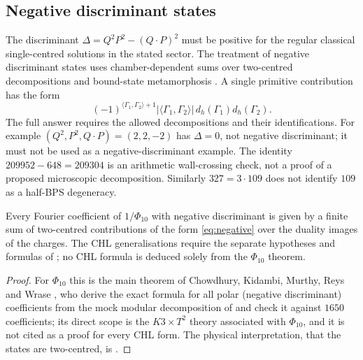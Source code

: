\subsection{Negative discriminant states}\label{ssec:negative}

The discriminant $\Delta=Q^2P^2-(Q\cdot P)^2$ must be positive for the regular classical single-centred solutions in the stated sector. The treatment of negative discriminant states uses chamber-dependent sums over two-centred decompositions and bound-state metamorphosis \cite{Sen11negative,CKMRW20}. A single primitive contribution has the form
\begin{equation}\label{eq:negative}
(-1)^{\langle\Gamma_1,\Gamma_2\rangle+1}|\langle\Gamma_1,\Gamma_2\rangle|\,d_h(\Gamma_1)d_h(\Gamma_2).
\end{equation}
The full answer requires the allowed decompositions and their identifications. For example $(Q^2,P^2,Q\cdot P)=(2,2,-2)$ has $\Delta=0$, not negative discriminant; it must not be used as a negative-discriminant example. The identity $209952-648=209304$ is an arithmetic wall-crossing check, not a proof of a proposed microscopic decomposition. Similarly $327=3\cdot109$ does not identify $109$ as a half-BPS degeneracy.

\begin{theorem}[claim 8]\label{thm:negative}
Every Fourier coefficient of $1/\Phi_{10}$ with negative discriminant is given by a finite sum of two-centred contributions of the form \eqref{eq:negative} over the duality images of the charges. The CHL generalisations require the separate hypotheses and formulas of \cite{Sen11negative}; no CHL formula is deduced solely from the $\Phi_{10}$ theorem.
\end{theorem}

\begin{proof}
For $\Phi_{10}$ this is the main theorem of Chowdhury, Kidambi, Murthy, Reys and Wrase \cite{CKMRW20}, who derive the exact formula for all polar (negative discriminant) coefficients from the mock modular decomposition of \cite{DMZ12} and check it against $1650$ coefficients; its direct scope is the $K3\times T^2$ theory associated with $\Phi_{10}$, and it is not cited as a proof for every CHL form. The physical interpretation, that the states are two-centred, is \cite{Sen11negative}.
\end{proof}

